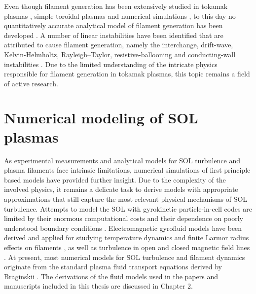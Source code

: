 Even though filament generation has been extensively studied in tokamak plasmas \cite{terry2005transport,agostini2007study}, simple toroidal plasmas \cite{theiler2008role,muller2007plasma,furno2008experimental,furno2008mechanism} and numerical simulations \cite{garcia2004computations,bisai2005edge,russell2007collisionality,russell2009saturation}, to this day no quantitatively accurate analytical model of filament generation has been developed \cite{d2011convective, krasheninnikov2007generation, krasheninnikov2008dynamics}.  A number of linear instabilities have been identified that are attributed to cause filament generation, namely the interchange, drift-wave, Kelvin-Helmholtz, Rayleigh–Taylor, resistive-ballooning and conducting-wall instabilities \cite{d2011convective,manz2015origin}. Due to the limited understanding of the intricate physics responsible for filament generation in tokamak plasmas, this topic remains a field of active research. 

\section{Numerical modeling of SOL plasmas}
As experimental measurements and analytical models for SOL turbulence and plasma filaments face intrinsic limitations, numerical simulations of first principle based models have provided further insight. Due to the complexity of the involved physics, it remains a delicate task to derive models with appropriate approximations that still capture the most relevant physical mechanisms of SOL turbulence. Attempts to model the SOL with gyrokinetic particle-in-cell codes are limited by their enormous computational costs and their dependence on poorly understood boundary conditions \cite{chang2008spontaneous,churchill2017pedestal}. Electromagnetic gyrofluid models have been derived \cite{madsen2013full} and applied for studying temperature dynamics and finite Larmor radius effects on filaments \cite{wiesenberger2014radial,held2016influence}, as well as turbulence in open and closed magnetic field lines \cite{ribeiro2005tokamak,ribeiro2008gyrofluid}. At present, most numerical models for SOL turbulence and filament dynamics originate from the standard plasma fluid transport equations derived by Braginskii \cite{braginskii}. The derivations of the fluid models used in the papers and manuscripts included in this thesis are discussed in Chapter 2. 


